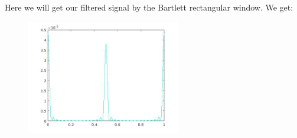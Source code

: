 \documentclass[a4paper,11pt]{article}
\begin{document}
Here we will get our filtered signal by the Bartlett rectangular window. We get:

\begin{figure}[!hp]
    \begin{center}
      \includegraphics[width=0.6\textwidth]{images/lab2_82.jpg}
    \end{center}
\end{figure}
\end{document}
